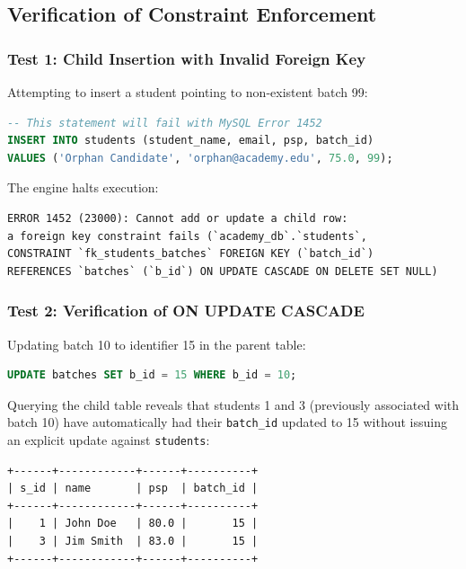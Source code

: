 \documentclass[10pt,journal,compsoc,onecolumn]{IEEEtran}
\begin{document}
\subsection{Verification of Constraint Enforcement}

\subsubsection{Test 1: Child Insertion with Invalid Foreign Key}
Attempting to insert a student pointing to non-existent batch 99:
\begin{lstlisting}[language=SQL]
-- This statement will fail with MySQL Error 1452
INSERT INTO students (student_name, email, psp, batch_id) 
VALUES ('Orphan Candidate', 'orphan@academy.edu', 75.0, 99);
\end{lstlisting}
The engine halts execution:
\begin{verbatim}
ERROR 1452 (23000): Cannot add or update a child row:
a foreign key constraint fails (`academy_db`.`students`,
CONSTRAINT `fk_students_batches` FOREIGN KEY (`batch_id`)
REFERENCES `batches` (`b_id`) ON UPDATE CASCADE ON DELETE SET NULL)
\end{verbatim}

\subsubsection{Test 2: Verification of ON UPDATE CASCADE}
Updating batch 10 to identifier 15 in the parent table:
\begin{lstlisting}[language=SQL]
UPDATE batches SET b_id = 15 WHERE b_id = 10;
\end{lstlisting}
Querying the child table reveals that students 1 and 3 (previously associated with batch 10) have automatically had their \texttt{batch\_id} updated to 15 without issuing an explicit update against \texttt{students}:
\begin{verbatim}
+------+------------+------+----------+
| s_id | name       | psp  | batch_id |
+------+------------+------+----------+
|    1 | John Doe   | 80.0 |       15 |
|    3 | Jim Smith  | 83.0 |       15 |
+------+------------+------+----------+
\end{verbatim}
\end{document}
